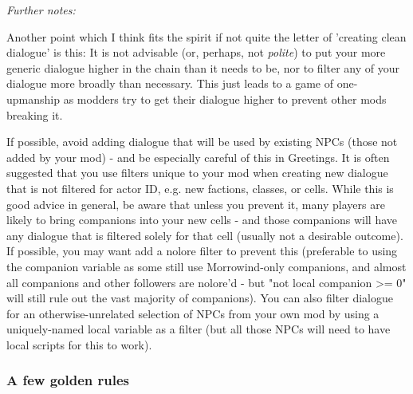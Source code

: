 \emph{Further notes:}

Another point which I think fits the spirit if not quite the letter of
'creating clean dialogue' is this: It is not advisable (or, perhaps, not
\emph{polite}) to put your more generic dialogue higher in the chain
than it needs to be, nor to filter any of your dialogue more broadly
than necessary. This just leads to a game of one-upmanship as modders
try to get their dialogue higher to prevent other mods breaking it.

If possible, avoid adding dialogue that will be used by existing NPCs
(those not added by your mod) - and be especially careful of this in
Greetings. It is often suggested that you use filters unique to your mod
when creating new dialogue that is not filtered for actor ID, e.g. new
factions, classes, or cells. While this is good advice in general, be
aware that unless you prevent it, many players are likely to bring
companions into your new cells - and those companions will have any
dialogue that is filtered solely for that cell (usually not a desirable
outcome). If possible, you may want add a nolore filter to prevent this
(preferable to using the companion variable as some still use
Morrowind-only companions, and almost all companions and other followers
are nolore'd - but "not local companion >= 0" will still rule
out the vast majority of companions). You can also filter dialogue for
an otherwise-unrelated selection of NPCs from your own mod by using a
uniquely-named local variable as a filter (but all those NPCs will need
to have local scripts for this to work).

\hypertarget{a-few-golden-rules}{%
\subsubsection{A few golden rules}\label{a-few-golden-rules}}

